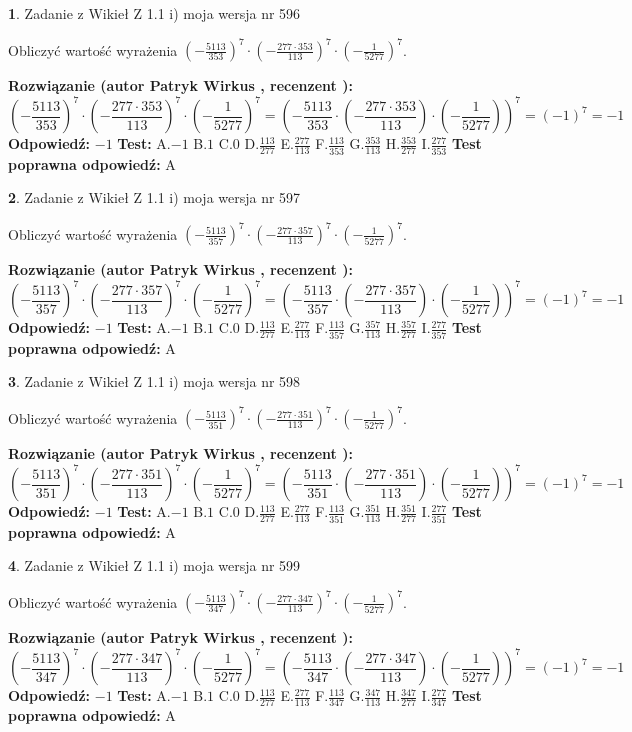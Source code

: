 \documentclass[12pt, a4paper]{article}
\theoremstyle{definition} %
\newtheorem{zad}{}
\newcommand{\zadStart}[1]{\begin{zad}#1\newline}
\newcommand{\zadStop}{\end{zad}}
\newcommand{\rozwStart}[2]{\noindent \textbf{Rozwiązanie (autor #1 , recenzent #2): }\newline}
\newcommand{\rozwStop}{\newline}
\newcommand{\odpStart}{\noindent \textbf{Odpowiedź:}\newline}
\newcommand{\odpStop}{\newline}
\newcommand{\testStart}{\noindent \textbf{Test:}\newline}
\newcommand{\testStop}{\newline}
\newcommand{\kluczStart}{\noindent \textbf{Test poprawna odpowiedź:}\newline}
\newcommand{\kluczStop}{\newline}
\begin{document}
\zadStart{Zadanie z Wikieł Z 1.1 i) moja wersja nr 596}

Obliczyć wartość wyrażenia $(-\frac{5113}{353})^{7} \cdot (-\frac{277 \cdot 353}{113})^{7} \cdot (-\frac{1}{5277})^{7}$.
\zadStop
\rozwStart{Patryk Wirkus}{}
$$(-\frac{5113}{353})^{7} \cdot (-\frac{277 \cdot 353}{113})^{7} \cdot (-\frac{1}{5277})^{7} = (-\frac{5113}{353} \cdot (-\frac{277 \cdot 353}{113}) \cdot (-\frac{1}{5277}))^{7} = (-1)^{7} = -1$$
\rozwStop
\odpStart
$-1$
\odpStop
\testStart
A.$-1$ B.$1$ C.$0$ D.$\frac{113}{277}$ E.$\frac{277}{113}$
F.$\frac{113}{353}$ G.$\frac{353}{113}$
H.$\frac{353}{277}$
I.$\frac{277}{353}$
\testStop
\kluczStart
A
\kluczStop



\zadStart{Zadanie z Wikieł Z 1.1 i) moja wersja nr 597}

Obliczyć wartość wyrażenia $(-\frac{5113}{357})^{7} \cdot (-\frac{277 \cdot 357}{113})^{7} \cdot (-\frac{1}{5277})^{7}$.
\zadStop
\rozwStart{Patryk Wirkus}{}
$$(-\frac{5113}{357})^{7} \cdot (-\frac{277 \cdot 357}{113})^{7} \cdot (-\frac{1}{5277})^{7} = (-\frac{5113}{357} \cdot (-\frac{277 \cdot 357}{113}) \cdot (-\frac{1}{5277}))^{7} = (-1)^{7} = -1$$
\rozwStop
\odpStart
$-1$
\odpStop
\testStart
A.$-1$ B.$1$ C.$0$ D.$\frac{113}{277}$ E.$\frac{277}{113}$
F.$\frac{113}{357}$ G.$\frac{357}{113}$
H.$\frac{357}{277}$
I.$\frac{277}{357}$
\testStop
\kluczStart
A
\kluczStop



\zadStart{Zadanie z Wikieł Z 1.1 i) moja wersja nr 598}

Obliczyć wartość wyrażenia $(-\frac{5113}{351})^{7} \cdot (-\frac{277 \cdot 351}{113})^{7} \cdot (-\frac{1}{5277})^{7}$.
\zadStop
\rozwStart{Patryk Wirkus}{}
$$(-\frac{5113}{351})^{7} \cdot (-\frac{277 \cdot 351}{113})^{7} \cdot (-\frac{1}{5277})^{7} = (-\frac{5113}{351} \cdot (-\frac{277 \cdot 351}{113}) \cdot (-\frac{1}{5277}))^{7} = (-1)^{7} = -1$$
\rozwStop
\odpStart
$-1$
\odpStop
\testStart
A.$-1$ B.$1$ C.$0$ D.$\frac{113}{277}$ E.$\frac{277}{113}$
F.$\frac{113}{351}$ G.$\frac{351}{113}$
H.$\frac{351}{277}$
I.$\frac{277}{351}$
\testStop
\kluczStart
A
\kluczStop



\zadStart{Zadanie z Wikieł Z 1.1 i) moja wersja nr 599}

Obliczyć wartość wyrażenia $(-\frac{5113}{347})^{7} \cdot (-\frac{277 \cdot 347}{113})^{7} \cdot (-\frac{1}{5277})^{7}$.
\zadStop
\rozwStart{Patryk Wirkus}{}
$$(-\frac{5113}{347})^{7} \cdot (-\frac{277 \cdot 347}{113})^{7} \cdot (-\frac{1}{5277})^{7} = (-\frac{5113}{347} \cdot (-\frac{277 \cdot 347}{113}) \cdot (-\frac{1}{5277}))^{7} = (-1)^{7} = -1$$
\rozwStop
\odpStart
$-1$
\odpStop
\testStart
A.$-1$ B.$1$ C.$0$ D.$\frac{113}{277}$ E.$\frac{277}{113}$
F.$\frac{113}{347}$ G.$\frac{347}{113}$
H.$\frac{347}{277}$
I.$\frac{277}{347}$
\testStop
\kluczStart
A
\kluczStop
\end{document}
